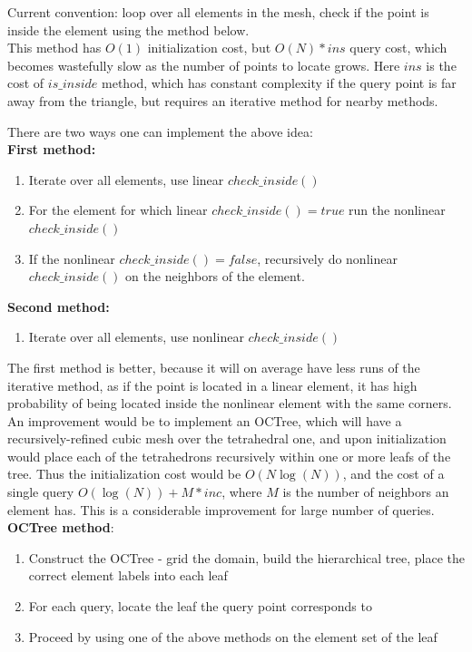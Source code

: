 \documentclass[12pt]{article}
\begin{document}
\noindent
Current convention: loop over all elements in the mesh, check if the point is inside the element using the method below. \\


\noindent
This method has $O(1)$ initialization cost, but $O(N) * ins$ query cost, which becomes wastefully slow as the number of points to locate grows. Here $ins$ is the cost of $is\_inside$ method, which has constant complexity if the query point is far away from the triangle, but requires an iterative method for nearby methods.

\noindent
There are two ways one can implement the above idea: \\
\textbf{First method:}
\begin{enumerate}
	\item Iterate over all elements, use linear $check\_inside()$
	\item For the element for which linear $check\_inside() = true$ run the nonlinear $check\_inside()$
	\item If the nonlinear $check\_inside() = false$, recursively do nonlinear $check\_inside()$ on the neighbors of the element.
\end{enumerate}
\textbf{Second method:}
\begin{enumerate}
	\item Iterate over all elements, use nonlinear $check\_inside()$
\end{enumerate}
\noindent
The first method is better, because it will on average have less runs of the iterative method, as if the point is located in a linear element, it has high probability of being located inside the nonlinear element with the same corners. \\

\noindent
An improvement would be to implement an OCTree, which will have a recursively-refined cubic mesh over the tetrahedral one, and upon initialization would place each of the tetrahedrons recursively within one or more leafs of the tree. Thus the initialization cost would be $O(N \log(N))$, and the cost of a single query $O(\log(N)) + M * inc$, where $M$ is the number of neighbors an element has. This is a considerable improvement for large number of queries. \\

\noindent
\textbf{OCTree method}:
\begin{enumerate}
	\item Construct the OCTree - grid the domain, build the hierarchical tree, place the correct element labels into each leaf
	\item For each query, locate the leaf the query point corresponds to
	\item Proceed by using one of the above methods on the element set of the leaf
\end{enumerate}
\end{document}
